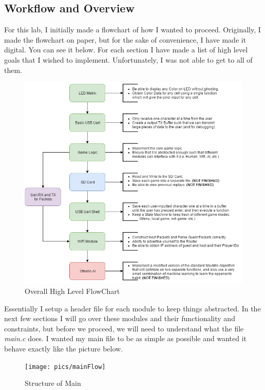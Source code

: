\documentclass[a4paper, 12pt]{article}
\begin{document}
    \subsection{Workflow and Overview}

    For this lab, I initially made a flowchart of how I wanted to proceed.
    Originally, I made the flowchart on paper, but for the sake of
    convenience, I have made it digital. You can see it below. For each
    section I have made a list of high level goals that I wished to
    implement. Unfortunately, I was not able to get to all of them. 

    \begin{figure}[H]
        \centering
        \includegraphics[scale=0.6]{pics/othelloFlow}
        \caption{Overall High Level FlowChart}
        \label{fig:PerfSetup}
    \end{figure}

    Essentially I setup a header file for each module to keep things
    abstracted. In the next few sections I will go over these modules and
    their functionality and constraints, but before we proceed, we will need
    to understand what the file \textit{main.c} does. I wanted my main file
    to be as simple as possible and wanted it behave exactly like the
    picture below.

    \begin{figure}[H]
        \centering
        \texttt{[image: pics/mainFlow]}
        \caption{Structure of Main}
        \label{fig:PerfSetup}
    \end{figure}
\end{document}
